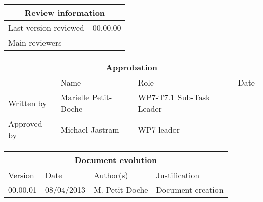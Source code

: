 \documentclass{template/openetcs_report}
\begin{document}
\begin{tabular}{|p{4.4cm}|p{8.7cm}|}
\hline
\multicolumn{2}{|c|}{Review information} \\
\hline
Last version reviewed & 00.00.00 \\
\hline
Main reviewers &  \\
\hline
\end{tabular}

\begin{tabular}{|p{2.2cm}|p{4cm}|p{4cm}|p{2cm}|}
\hline
\multicolumn{4}{|c|}{Approbation} \\
\hline
  &  Name & Role & Date   \\
\hline  
Written by    &  Marielle Petit-Doche & WP7-T7.1 Sub-Task Leader  & \\
\hline
Approved by & Michael Jastram & WP7 leader & \\
\hline
\end{tabular}

\begin{tabular}{|p{2.2cm}|p{2cm}|p{3cm}|p{5cm}|}
\hline
\multicolumn{4}{|c|}{Document evolution} \\
\hline
Version &  Date & Author(s) & Justification  \\
\hline  
00.00.01 & 08/04/2013 & M. Petit-Doche &  Document creation  \\
\hline  
\end{tabular}



\newcommand{\tbd}{\colorbox{cyan}{\%\%To Be Defined\%\%}}
\newcommand{\tbc}{\colorbox{cyan}{\%\%To Be Confirmed\%\%}}
\newcommand{\todo}[1]{\colorbox{cyan}{\%\%{#1}\%\%}}
\newlength{\origindent}

\newenvironment{issue}{
        \begin{quote}
        \begin{itshape}Open Issue.
}{
        \end{itshape}
        \end{quote}
}

\newenvironment{comment}{
        \begin{quote}
        \begin{itshape}Comment.
}{
        \end{itshape}
        \end{quote}
}
\end{document}
